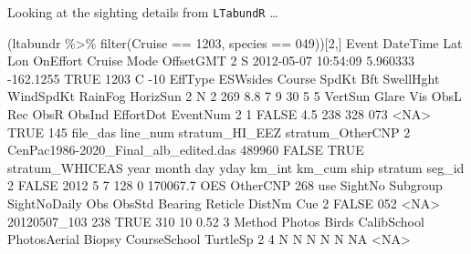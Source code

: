 \documentclass[
]{book}
\newenvironment{Shaded}{\begin{snugshade}}{\end{snugshade}}
\newcommand{\ConstantTok}[1]{\textcolor[rgb]{0.00,0.00,0.00}{#1}}
\newcommand{\DecValTok}[1]{\textcolor[rgb]{0.00,0.00,0.81}{#1}}
\newcommand{\FloatTok}[1]{\textcolor[rgb]{0.00,0.00,0.81}{#1}}
\newcommand{\FunctionTok}[1]{\textcolor[rgb]{0.00,0.00,0.00}{#1}}
\newcommand{\NormalTok}[1]{#1}
\newcommand{\SpecialCharTok}[1]{\textcolor[rgb]{0.00,0.00,0.00}{#1}}
\newcommand{\StringTok}[1]{\textcolor[rgb]{0.31,0.60,0.02}{#1}}
\begin{document}
Looking at the sighting details from \texttt{LTabundR} \ldots{}

\begin{Shaded}
\begin{Highlighting}[]
\NormalTok{(ltabundr }\SpecialCharTok{\%\textgreater{}\%} \FunctionTok{filter}\NormalTok{(Cruise }\SpecialCharTok{==} \DecValTok{1203}\NormalTok{, species }\SpecialCharTok{==} \StringTok{\textquotesingle{}049\textquotesingle{}}\NormalTok{))[}\DecValTok{2}\NormalTok{,]}
\NormalTok{  Event            DateTime      Lat       Lon OnEffort Cruise Mode OffsetGMT}
\DecValTok{2}\NormalTok{     S }\DecValTok{2012{-}05{-}07} \DecValTok{10}\SpecialCharTok{:}\DecValTok{54}\SpecialCharTok{:}\DecValTok{09} \FloatTok{5.960333} \SpecialCharTok{{-}}\FloatTok{162.1255}     \ConstantTok{TRUE}   \DecValTok{1203}\NormalTok{    C       }\SpecialCharTok{{-}}\DecValTok{10}
\NormalTok{  EffType ESWsides Course SpdKt Bft SwellHght WindSpdKt RainFog HorizSun}
\DecValTok{2}\NormalTok{       N        }\DecValTok{2}    \DecValTok{269}   \FloatTok{8.8}   \DecValTok{7}         \DecValTok{9}        \DecValTok{30}       \DecValTok{5}        \DecValTok{5}
\NormalTok{  VertSun Glare Vis ObsL Rec ObsR ObsInd EffortDot EventNum}
\DecValTok{2}       \DecValTok{1} \ConstantTok{FALSE} \FloatTok{4.5}  \DecValTok{238} \DecValTok{328}  \DecValTok{073}   \SpecialCharTok{\textless{}}\ConstantTok{NA}\SpecialCharTok{\textgreater{}}      \ConstantTok{TRUE}      \DecValTok{145}
\NormalTok{                              file\_das line\_num stratum\_HI\_EEZ stratum\_OtherCNP}
\DecValTok{2}\NormalTok{ CenPac1986}\SpecialCharTok{{-}}\NormalTok{2020\_Final\_alb\_edited.das   }\DecValTok{489960}          \ConstantTok{FALSE}             \ConstantTok{TRUE}
\NormalTok{  stratum\_WHICEAS year month day yday km\_int   km\_cum ship  stratum seg\_id}
\DecValTok{2}           \ConstantTok{FALSE} \DecValTok{2012}     \DecValTok{5}   \DecValTok{7}  \DecValTok{128}      \DecValTok{0} \FloatTok{170067.7}\NormalTok{  OES OtherCNP    }\DecValTok{268}
\NormalTok{    use SightNo Subgroup SightNoDaily Obs ObsStd Bearing Reticle DistNm Cue}
\DecValTok{2} \ConstantTok{FALSE}     \DecValTok{052}     \SpecialCharTok{\textless{}}\ConstantTok{NA}\SpecialCharTok{\textgreater{}}\NormalTok{ 20120507\_103 }\DecValTok{238}   \ConstantTok{TRUE}     \DecValTok{310}      \DecValTok{10}   \FloatTok{0.52}   \DecValTok{3}
\NormalTok{  Method Photos Birds CalibSchool PhotosAerial Biopsy CourseSchool TurtleSp}
\DecValTok{2}      \DecValTok{4}\NormalTok{      N     N           N            N      N           }\ConstantTok{NA}     \SpecialCharTok{\textless{}}\ConstantTok{NA}\SpecialCharTok{\textgreater{}}

\end{Highlighting}
\end{Shaded}
\end{document}

